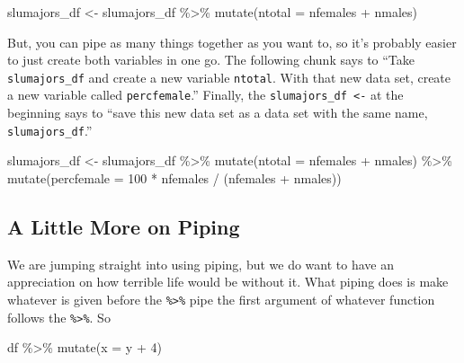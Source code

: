 \documentclass[
]{book}
\newenvironment{Shaded}{\begin{snugshade}}{\end{snugshade}}
\newcommand{\AttributeTok}[1]{\textcolor[rgb]{0.77,0.63,0.00}{#1}}
\newcommand{\DecValTok}[1]{\textcolor[rgb]{0.00,0.00,0.81}{#1}}
\newcommand{\FunctionTok}[1]{\textcolor[rgb]{0.00,0.00,0.00}{#1}}
\newcommand{\NormalTok}[1]{#1}
\newcommand{\OtherTok}[1]{\textcolor[rgb]{0.56,0.35,0.01}{#1}}
\newcommand{\SpecialCharTok}[1]{\textcolor[rgb]{0.00,0.00,0.00}{#1}}
\begin{document}
\begin{Shaded}
\begin{Highlighting}[]
\NormalTok{slumajors\_df }\OtherTok{\textless{}{-}}\NormalTok{ slumajors\_df }\SpecialCharTok{\%\textgreater{}\%} \FunctionTok{mutate}\NormalTok{(}\AttributeTok{ntotal =}\NormalTok{ nfemales }\SpecialCharTok{+}\NormalTok{ nmales)}
\end{Highlighting}
\end{Shaded}

But, you can pipe as many things together as you want to, so it's probably easier to just create both variables in one go. The following chunk says to ``Take \texttt{slumajors\_df} and create a new variable \texttt{ntotal}. With that new data set, create a new variable called \texttt{percfemale}.'' Finally, the \texttt{slumajors\_df\ \textless{}-} at the beginning says to ``save this new data set as a data set with the same name, \texttt{slumajors\_df}.''

\begin{Shaded}
\begin{Highlighting}[]
\NormalTok{slumajors\_df }\OtherTok{\textless{}{-}}\NormalTok{ slumajors\_df }\SpecialCharTok{\%\textgreater{}\%}
  \FunctionTok{mutate}\NormalTok{(}\AttributeTok{ntotal =}\NormalTok{ nfemales }\SpecialCharTok{+}\NormalTok{ nmales) }\SpecialCharTok{\%\textgreater{}\%}
  \FunctionTok{mutate}\NormalTok{(}\AttributeTok{percfemale =} \DecValTok{100} \SpecialCharTok{*}\NormalTok{ nfemales }\SpecialCharTok{/}\NormalTok{ (nfemales }\SpecialCharTok{+}\NormalTok{ nmales))}
\end{Highlighting}
\end{Shaded}

\hypertarget{a-little-more-on-piping}{%
\subsection{A Little More on Piping}\label{a-little-more-on-piping}}

We are jumping straight into using piping, but we do want to have an appreciation on how terrible life would be without it. What piping does is make whatever is given before the \texttt{\%\textgreater{}\%} pipe the first argument of whatever function follows the \texttt{\%\textgreater{}\%}. So

\begin{Shaded}
\begin{Highlighting}[]
\NormalTok{df }\SpecialCharTok{\%\textgreater{}\%} \FunctionTok{mutate}\NormalTok{(}\AttributeTok{x =}\NormalTok{ y }\SpecialCharTok{+} \DecValTok{4}\NormalTok{)}
\end{Highlighting}
\end{Shaded}
\end{document}
